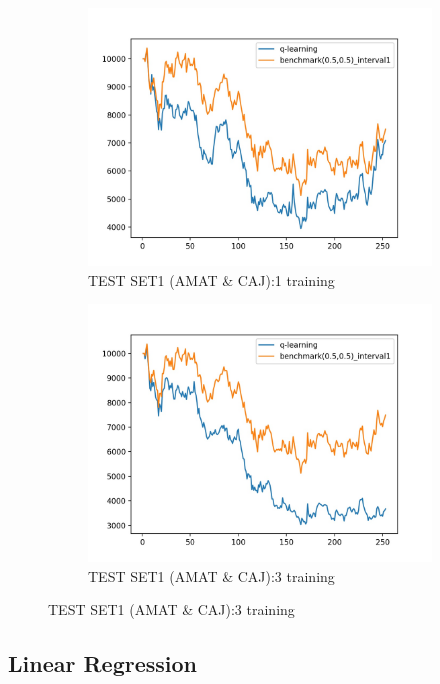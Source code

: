 \begin{figure}[H]
\begin{subfigure}{.5\textwidth}%
\centering
\includegraphics[clip, width=1.1\textwidth]{Graphics/test_KS1_AC_action.jpg} \caption{TEST SET1 (AMAT \& CAJ):1 training} 
\end{subfigure}%
\begin{subfigure}{.5\textwidth}%
\centering
\includegraphics[clip, width=1.1\textwidth]{Graphics/test_LP3_AC_action.jpg} \caption{TEST SET1 (AMAT \& CAJ):3 training}
\end{subfigure}%
\end{figure}%

\subsection{Linear Regression}

